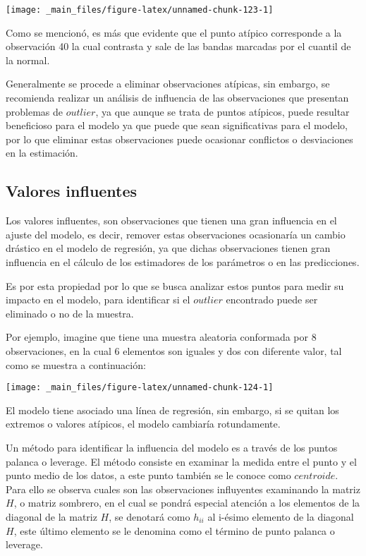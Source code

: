 \documentclass[
  a4paper,
  oneside,
  openany]{book}
\begin{document}
\begin{center}\texttt{[image: \_main\_files/figure-latex/unnamed-chunk-123-1]} \end{center}

Como se mencionó, es más que evidente que el punto atípico corresponde a la observación 40 la cual contrasta y sale de las bandas marcadas por el cuantil de la normal.

Generalmente se procede a eliminar observaciones atípicas, sin embargo, se recomienda realizar un análisis de influencia de las observaciones que presentan problemas de \(outlier\), ya que aunque se trata de puntos atípicos, puede resultar beneficioso para el modelo ya que puede que sean significativas para el modelo, por lo que eliminar estas observaciones puede ocasionar conflictos o desviaciones en la estimación.

\hypertarget{valores-influentes}{%
\subsection{Valores influentes}\label{valores-influentes}}

Los valores influentes, son observaciones que tienen una gran influencia en el ajuste del modelo, es decir, remover estas observaciones ocasionaría un cambio drástico en el modelo de regresión, ya que dichas observaciones tienen gran influencia en el cálculo de los estimadores de los parámetros o en las predicciones.

Es por esta propiedad por lo que se busca analizar estos puntos para medir su impacto en el modelo, para identificar si el \(outlier\) encontrado puede ser eliminado o no de la muestra.

Por ejemplo, imagine que tiene una muestra aleatoria conformada por 8 observaciones, en la cual 6 elementos son iguales y dos con diferente valor, tal como se muestra a continuación:

\begin{center}\texttt{[image: \_main\_files/figure-latex/unnamed-chunk-124-1]} \end{center}

El modelo tiene asociado una línea de regresión, sin embargo, si se quitan los extremos o valores atípicos, el modelo cambiaría rotundamente.

Un método para identificar la influencia del modelo es a través de los puntos palanca o leverage. El método consiste en examinar la medida entre el punto y el punto medio de los datos, a este punto también se le conoce como \(centroide\). Para ello se observa cuales son las observaciones influyentes examinando la matriz \(H\), o matriz sombrero, en el cual se pondrá especial atención a los elementos de la diagonal de la matriz \(H\), se denotará como \(h_{ii}\) al i-ésimo elemento de la diagonal \(H\), este último elemento se le denomina como el término de punto palanca o leverage.
\end{document}
